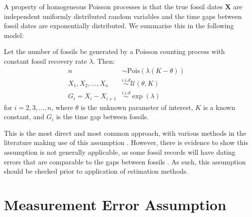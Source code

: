 A property of homogeneous Poisson processes is that the true fossil dates $\bm{X}$ are independent uniformly distributed random variables and the time gaps between fossil dates are exponentially distributed. We summarise this in the following model:
\begin{model}\label{model: no-measurement-error}
    Let the number of fossils be generated by a Poisson counting process with constant fossil recovery rate $\lambda$. Then:
    \begin{align*}
        n &\sim \textrm{Pois}(\lambda(K-\theta)) \\
        X_1, X_2, \dots, X_n  &\overset{i.i.d}{\sim} \mathcal{U}(\theta, K) \\
        G_i = X_i - X_{i+1} &\overset{i.i.d}{\sim} \exp{(\lambda)}
    \end{align*}
    for $i = 2, 3, \dots, n$, where $\theta$ is the unknown parameter of interest, $K$ is a known constant, and $G_i$ is the time gap between fossils.
\end{model}

This is the most direct and most common approach, with various methods in the literature making use of this assumption \cite{Strauss1989, Weiss1999, Solow1993, Mcinerny2006, Wang2016}. However, there is evidence to show this assumption is not generally applicable, as some fossil records will have dating errors that are comparable to the gaps between fossils \cite{Solow2006}. As such, this assumption should be checked prior to application of estimation methods.

\section{Measurement Error Assumption}

